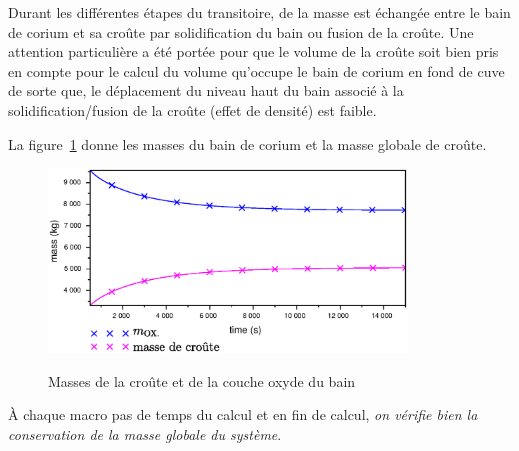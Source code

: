 Durant les différentes étapes du transitoire, de la masse est échangée entre le bain de corium et sa croûte par solidification du bain ou fusion de la croûte. Une attention particulière a été portée pour que le volume de la croûte soit bien pris en compte pour le calcul du volume qu'occupe le bain de corium en fond de cuve de sorte que, le déplacement du niveau haut du bain associé à la solidification/fusion de la croûte (effet de densité) est faible.

La figure~\ref{fig:mass_balance} donne les masses du bain de corium et la masse globale de croûte.
\begin{figure}[H]
\centering
\includegraphics[width=0.85\textwidth, keepaspectratio=true]{Figures/mass_balance.eps}\\
\caption{Masses de la croûte et de la couche oxyde du bain}
\label{fig:mass_balance}
\end{figure}
À chaque macro pas de temps du calcul et en fin de calcul, \emph{on vérifie bien la conservation de la masse globale du système}.

